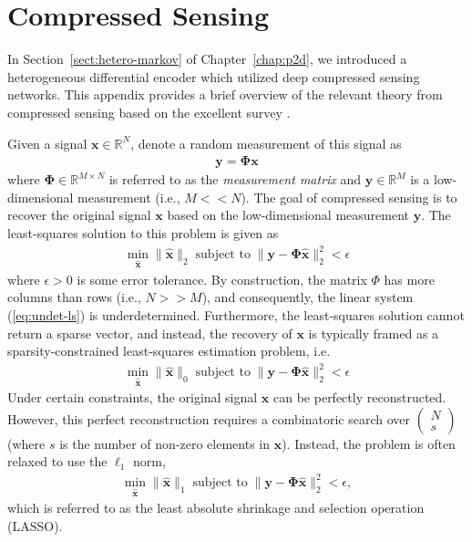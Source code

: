 \chapter{Compressed Sensing}
\label{appdx:compressed-sensing}

In Section~\ref{sect:hetero-markov} of Chapter~\ref{chap:p2d}, we introduced a heterogeneous differential encoder which utilized deep compressed sensing networks. This appendix provides a brief overview of the relevant theory from compressed sensing based on the excellent survey \cite{ref:Marques2019ReviewOfSparseRecovery}.

Given a signal $\mathbf{x}\in\mathbb{R}^N$, denote a random measurement of this signal as 
\begin{align*}
    \mathbf{y} = \mathbf{\Phi}\mathbf{x}
\end{align*}
where $\mathbf{\Phi}\in\mathbb{R}^{M\times N}$ is referred to as the \emph{measurement matrix} and $\mathbf{y}\in\mathbb{R}^{M}$ is a low-dimensional measurement (i.e., $M << N$). The goal of compressed sensing is to recover the original signal $\mathbf{x}$ based on the low-dimensional measurement $\mathbf{y}$. The least-squares solution to this problem is given as
\begin{align}
    \min_{\hat{\mathbf{x}}}\|\hat{\mathbf{x}}\|_2 \; \text{subject to} \; \|\mathbf{y} - \mathbf{\Phi}\hat{\mathbf{x}}\|_2^2 < \epsilon \label{eq:undet-ls}
\end{align}
where $\epsilon > 0$ is some error tolerance. By construction, the matrix $\Phi$ has more columns than rows (i.e., $N >> M$), and consequently, the linear system (\ref{eq:undet-ls}) is underdetermined. Furthermore, the least-squares solution cannot return a sparse vector, and instead, the recovery of $\mathbf{x}$ is typically framed as a sparsity-constrained least-squares estimation problem, i.e.
\begin{align}
    \min_{\hat{\mathbf{x}}}\|\hat{\mathbf{x}}\|_0 \; \text{subject to} \; \|\mathbf{y} - \mathbf{\Phi}\hat{\mathbf{x}}\|_2^2 < \epsilon \label{eq:sparse-ls}
\end{align}
Under certain constraints, the original signal $\mathbf{x}$ can be perfectly reconstructed. However, this perfect reconstruction requires a combinatoric search over $\begin{pmatrix}N \\ s\end{pmatrix}$ (where $s$ is the number of non-zero elements in $\mathbf{x}$).
Instead, the problem is often relaxed to use the $\ell_1$ norm,
\begin{align}
    \min_{\hat{\mathbf{x}}}\|\hat{\mathbf{x}}\|_1 \; \text{subject to} \; \|\mathbf{y} - \mathbf{\Phi}\hat{\mathbf{x}}\|_2^2 < \epsilon, \label{eq:lasso-ls}
\end{align}
which is referred to as the least absolute shrinkage and selection operation (LASSO). 

